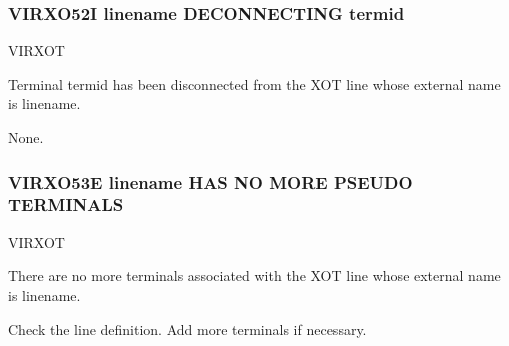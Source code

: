 \documentclass[letterpaper,10pt,english]{sphinxmanual}
\begin{document}
\subsubsection{VIRXO52I linename DECONNECTING termid}
\label{\detokenize{messages:virxo52i-linename-deconnecting-termid}}\begin{description}
\sphinxAtStartPar
VIRXOT

\sphinxAtStartPar
Terminal termid has been disconnected from the XOT line whose external name is linename.

\sphinxAtStartPar
None.

\end{description}


\subsubsection{VIRXO53E linename HAS NO MORE PSEUDO TERMINALS}
\label{\detokenize{messages:virxo53e-linename-has-no-more-pseudo-terminals}}\begin{description}
\sphinxAtStartPar
VIRXOT

\sphinxAtStartPar
There are no more terminals associated with the XOT line whose external name is linename.

\sphinxAtStartPar
Check the line definition. Add more terminals if necessary.

\end{description}
\end{document}
